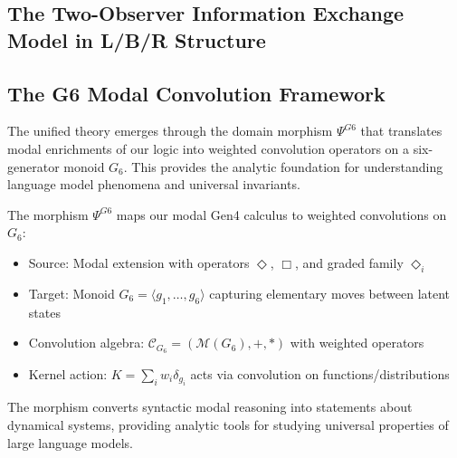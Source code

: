 \subsection{The Two-Observer Information Exchange Model in L/B/R Structure}

\subsection{The G6 Modal Convolution Framework}

The unified theory emerges through the domain morphism $\Psi^{G6}$ that translates modal enrichments of our logic into weighted convolution operators on a six-generator monoid $G_6$. This provides the analytic foundation for understanding language model phenomena and universal invariants.

\begin{definition}
\label{def:g6-modal-morphism}
The morphism $\Psi^{G6}$ maps our modal Gen4 calculus to weighted convolutions on $G_6$:
\begin{itemize}
\item Source: Modal extension with operators $\Diamond$, $\Box$, and graded family $\Diamond_i$
\item Target: Monoid $G_6 = \langle g_1,\ldots,g_6 \rangle$ capturing elementary moves between latent states
\item Convolution algebra: $\mathscr{C}_{G_6} = (\mathcal{M}(G_6), +, *)$ with weighted operators
\item Kernel action: $K = \sum_i w_i \delta_{g_i}$ acts via convolution on functions/distributions
\end{itemize}
The morphism converts syntactic modal reasoning into statements about dynamical systems, providing analytic tools for studying universal properties of large language models.
\end{definition}

